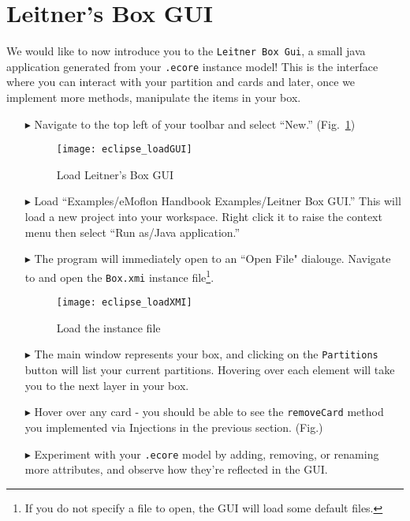 \newpage
\section{Leitner's Box GUI}
\genHeader
\hypertarget{sec:LBGUI}{}

We would like to now introduce you to the \texttt{Leitner Box Gui}, a small java application generated from your \texttt{.ecore} instance model! This is the
interface where you can interact with your partition and cards and later, once we implement more methods, manipulate the items in your box.

\begin{itemize}

\item[$\blacktriangleright$] Navigate to the top left of your toolbar and select ``New.'' (Fig.~\ref{fig:load_GUI})

\begin{figure}[htbp]
    \centering
    \texttt{[image: eclipse\_loadGUI]}
    \caption{Load Leitner's Box GUI}
    \label{fig:load_GUI}
\end{figure}

\item[$\blacktriangleright$] Load ``Examples/eMoflon Handbook Examples/Leitner Box GUI.'' This will load a new project into your workspace. Right click it to
raise the context menu then select ``Run as/Java application.'' 

\item[$\blacktriangleright$] The program will immediately open to an ``Open File" dialouge. Navigate to and open the \texttt{Box.xmi} instance
file\footnote{If you do not specify a file to open, the GUI will load some default files.}.

\begin{figure}[htbp]
    \centering
    \texttt{[image: eclipse\_loadXMI]}
    \caption{Load the instance file}
    \label{fig:load_XMI}
\end{figure}

\item[$\blacktriangleright$] The main window represents your box, and clicking on the \texttt{Partitions} button will list your current partitions. Hovering
over each element will take you to the next layer in your box.

\item[$\blacktriangleright$] Hover over any card - you should be able to see the \texttt{removeCard} method you implemented via Injections in the previous
section. (Fig.)

\item[$\blacktriangleright$] Experiment with your \texttt{.ecore} model by adding, removing, or renaming more attributes, and observe how they're reflected in
the GUI.


\end{itemize}
